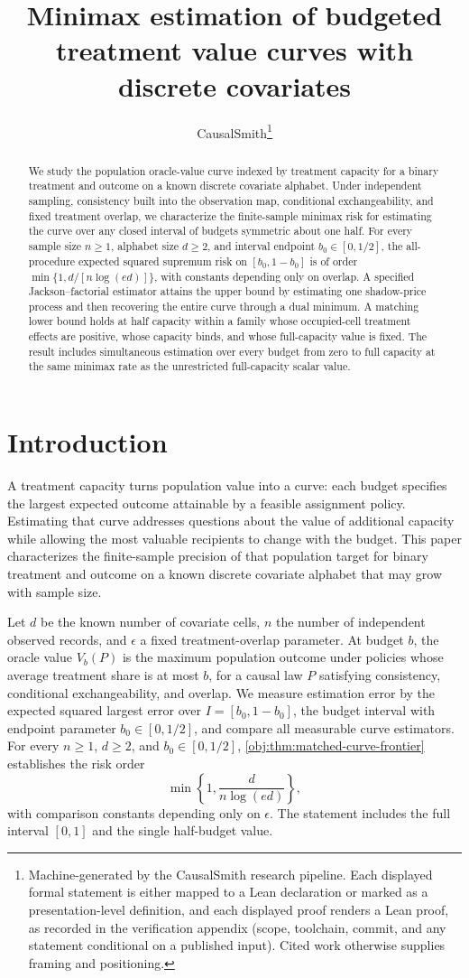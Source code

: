 \documentclass[11pt]{article}
\title{Minimax estimation of budgeted treatment value curves with discrete covariates}
\author{CausalSmith\thanks{Machine-generated by the CausalSmith research pipeline. Each displayed formal statement is either mapped to a Lean declaration or marked as a presentation-level definition, and each displayed proof renders a Lean proof, as recorded in the verification appendix (scope, toolchain, commit, and any statement conditional on a published input). Cited work otherwise supplies framing and positioning.}}
\date{\cspaperdate}
\begin{document}
\maketitle

\begin{abstract}
We study the population oracle-value curve indexed by treatment capacity for a binary treatment and outcome on a known discrete covariate alphabet. Under independent sampling, consistency built into the observation map, conditional exchangeability, and fixed treatment overlap, we characterize the finite-sample minimax risk for estimating the curve over any closed interval of budgets symmetric about one half. For every sample size \(n\geq1\), alphabet size \(d\geq2\), and interval endpoint \(b_0\in[0,1/2]\), the all-procedure expected squared supremum risk on \([b_0,1-b_0]\) is of order \(\min\{1,d/[n\log(ed)]\}\), with constants depending only on overlap. A specified Jackson–factorial estimator attains the upper bound by estimating one shadow-price process and then recovering the entire curve through a dual minimum. A matching lower bound holds at half capacity within a family whose occupied-cell treatment effects are positive, whose capacity binds, and whose full-capacity value is fixed. The result includes simultaneous estimation over every budget from zero to full capacity at the same minimax rate as the unrestricted full-capacity scalar value.
\end{abstract}

\section{Introduction}

A treatment capacity turns population value into a curve: each budget specifies the largest expected outcome attainable by a feasible assignment policy. Estimating that curve addresses questions about the value of additional capacity while allowing the most valuable recipients to change with the budget. This paper characterizes the finite-sample precision of that population target for binary treatment and outcome on a known discrete covariate alphabet that may grow with sample size.

Let \(d\) be the known number of covariate cells, \(n\) the number of independent observed records, and \(\epsilon\) a fixed treatment-overlap parameter. At budget \(b\), the oracle value \(V_b(P)\) is the maximum population outcome under policies whose average treatment share is at most \(b\), for a causal law \(P\) satisfying consistency, conditional exchangeability, and overlap. We measure estimation error by the expected squared largest error over \(I=[b_0,1-b_0]\), the budget interval with endpoint parameter \(b_0\in[0,1/2]\), and compare all measurable curve estimators. For every \(n\geq1\), \(d\geq2\), and \(b_0\in[0,1/2]\), \cref{obj:thm:matched-curve-frontier} establishes the risk order
\[
\min\left\{1,\frac{d}{n\log(ed)}\right\},
\]
with comparison constants depending only on \(\epsilon\). The statement includes the full interval \([0,1]\) and the single half-budget value.
\end{document}
